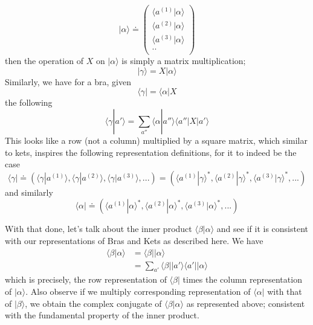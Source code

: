 \documentclass[12pt]{article}
\def\bra#1{\langle#1|}
\def\ket#1{|#1 \rangle}
\def\inpr#1#2{\langle #1|#2 \rangle}
\def\braket#1#2#3{\langle#1|#2|#3\rangle}
\begin{document}
				\begin{equation}
				\ket \alpha \doteq
				\left(
				\begin{array}{c}
					\inpr{a^{(1)}}\alpha \\
					\inpr{a^{(2)}}\alpha \\
					\inpr{a^{(3)}}\alpha \\
					.. \\
				\end{array}
				\right)
				\label{ket_matrix_representation}
				\end{equation}
				then the operation of $X$ on $\ket \alpha$ is simply a matrix multiplication;
				\begin{equation}
					\ket \gamma = X \ket \alpha
				\end{equation}
				Similarly, we have for a bra, given
				\begin{equation}
					\bra \gamma = \bra \alpha X
				\end{equation}
				the following
				\begin{equation}
					\inpr \gamma {a'} = \sum_{a''} \inpr {\alpha}{a''} \braket {a''}X{a'}
				\end{equation}
				This looks like a row (not a column) multiplied by a square matrix, which similar to kets, inspires the following representation definitions, for it to indeed be the case
				\begin{equation}
					\bra \gamma \doteq \left( \inpr \gamma {a^{(1)}}, \inpr \gamma {a^{(2)}}, \inpr \gamma {a^{(3)}}, ... \right)
					=\left( \inpr {a^{(1)}} \gamma ^*, \inpr {a^{(2)}} \gamma ^*, \inpr {a^{(3)}} \gamma ^*, ... \right)
				\end{equation}
				and similarly
				\begin{equation}
					\bra \alpha \doteq \left( \inpr {a^{(1)}} \alpha ^*, \inpr {a^{(2)}} \alpha ^*, \inpr {a^{(3)}} \alpha ^*, ... \right)
				\end{equation}
				\par
				With that done, let's talk about the inner product $\inpr \beta \alpha$ and see if it is consistent with our representations of Bras and Kets as described here. We have
				\begin{align}
					\inpr \beta \alpha 	&= \bra \beta \ket \alpha \\
										&= \sum_{a'} \bra \beta \ket {a'} \bra {a'} \ket \alpha
				\end{align}
				which is precisely, the row representation of $\bra \beta$ times the column representation of $\ket \alpha$. Also observe if we multiply corresponding representation of $\bra \alpha$ with that of $\ket \beta$, we obtain the complex conjugate of $\inpr \beta \alpha$ as represented above; consistent with the fundamental property of the inner product.
\end{document}
